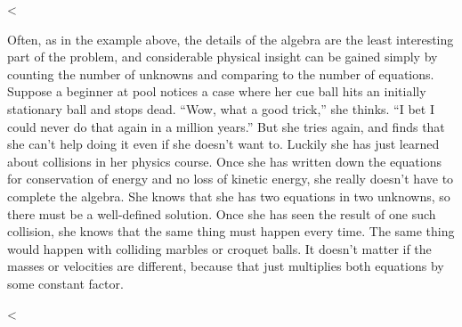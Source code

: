 %
<%

Often, as in the example above, the details of the algebra
are the least interesting part of the problem, and
considerable physical insight can be gained simply by
counting the number of unknowns and comparing to the number
of equations. Suppose a beginner at pool notices a case
where her cue ball hits an initially stationary ball and
stops dead. ``Wow, what a good trick,'' she thinks. ``I bet
I could never do that again in a million years.'' But she
tries again, and finds that she can't help doing it even if
she doesn't want to. Luckily she has just learned about
collisions in her physics course. Once she has written down
the equations for conservation of energy and no loss of
kinetic energy, she really doesn't have to complete the
algebra. She knows that she has two equations in two
unknowns, so there must be a well-defined solution. Once she
has seen the result of one such collision, she knows that
the same thing must happen every time. The same thing would
happen with colliding marbles or croquet balls. It doesn't
matter if the masses or velocities are different, because
that just multiplies both equations by some constant factor.

<%

